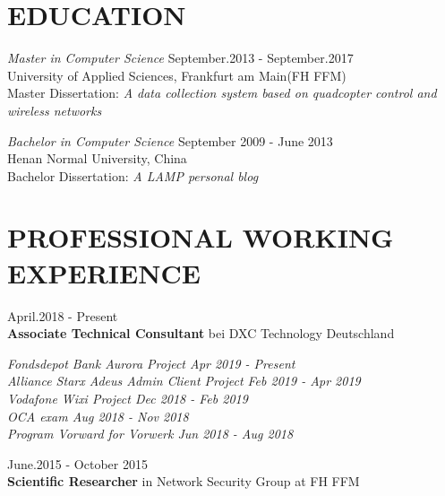 \documentclass[margin, 10pt]{res} %
\begin{document}
\begin{resume}
\section{EDUCATION}

{\sl Master in Computer Science} \hfill  
September.2013 - September.2017
\\ University of Applied Sciences, Frankfurt am Main(FH FFM)\\
Master Dissertation: \textit{A data collection system based on quadcopter control and wireless networks}

{\sl Bachelor in Computer Science} \hfill September 2009 - June 2013 \\
Henan Normal University, China\\
Bachelor Dissertation: \textit{A LAMP personal blog}


\section{PROFESSIONAL WORKING EXPERIENCE} 

April.2018 - Present\\
{\bf Associate Technical Consultant} bei DXC Technology Deutschland

{\sl Fondsdepot Bank Aurora Project \hfill Apr 2019 - Present}\\
{\sl Alliance Starx Adeus Admin Client Project	\hfill Feb 2019 - Apr 2019}\\
{\sl Vodafone Wixi Project \hfill  Dec 2018 - Feb 2019}\\
{\sl OCA exam \hfill Aug 2018 - Nov 2018}  \\
{\sl Program Vorward for Vorwerk \hfill Jun 2018 - Aug 2018}

June.2015 - October 2015\\
{\bf Scientific Researcher} in Network Security Group at FH FFM 









\end{resume}
\end{document}
